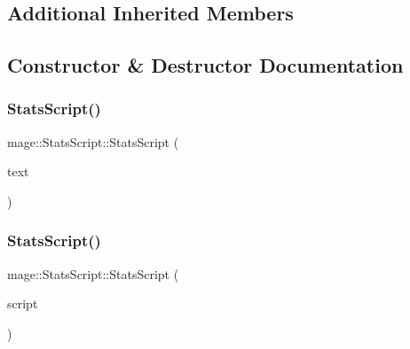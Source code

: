 \subsection*{Additional Inherited Members}


\subsection{Constructor \& Destructor Documentation}
\hypertarget{classmage_1_1_stats_script_a1deb5458611675fc99309edd01d285f8}{}\label{classmage_1_1_stats_script_a1deb5458611675fc99309edd01d285f8} 
\subsubsection{\texorpdfstring{Stats\+Script()}{StatsScript()}\hspace{0.1cm}{\footnotesize\ttfamily [1/3]}}
{\footnotesize\ttfamily mage\+::\+Stats\+Script\+::\+Stats\+Script (\begin{DoxyParamCaption}\item[{\hyperlink{classmage_1_1_sprite_text}{Sprite\+Text} $\ast$}]{text }\end{DoxyParamCaption})\hspace{0.3cm}{\ttfamily [explicit]}}

\hypertarget{classmage_1_1_stats_script_aab237b7c391d7ca7ad96cfa33a3aac81}{}\label{classmage_1_1_stats_script_aab237b7c391d7ca7ad96cfa33a3aac81} 
\subsubsection{\texorpdfstring{Stats\+Script()}{StatsScript()}\hspace{0.1cm}{\footnotesize\ttfamily [2/3]}}
{\footnotesize\ttfamily mage\+::\+Stats\+Script\+::\+Stats\+Script (\begin{DoxyParamCaption}\item[{const \hyperlink{classmage_1_1_stats_script}{Stats\+Script} \&}]{script }\end{DoxyParamCaption})\hspace{0.3cm}{\ttfamily [delete]}}

\hypertarget{classmage_1_1_stats_script_af511d7e2e6bec30cd05782de94c65abe}{}\label{classmage_1_1_stats_script_af511d7e2e6bec30cd05782de94c65abe} 
